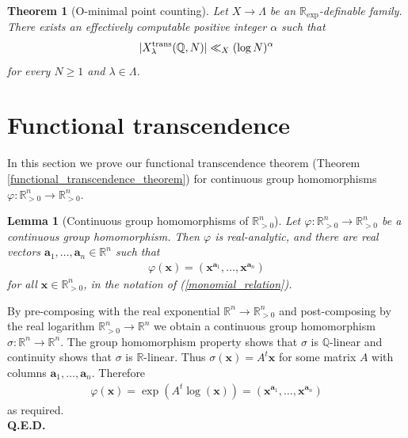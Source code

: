 \documentclass[9pt]{amsart}
\theoremstyle{my_theorem_style}
\numberwithin{definition}{section}
\newtheorem{theorem}[definition]{Theorem}
\newtheorem{lemma}[definition]{Lemma}
\renewenvironment{proof}{\noindent {\textbf{Proof.}}}{\\\textbf{Q.E.D.}}
\renewcommand{\phi}{\varphi}
\newcommand{\Q}{\mathbb{Q}}
\newcommand{\R}{\mathbb{R}}
\renewcommand{\vec}[1]{\bm{#1}}
\begin{document}
\begin{theorem}
[O-minimal point counting]
\label{bnz_counting_theorem}
    \cite[Equation (6)]{Binyamini--Novikov--Zak_Wilkie's_conjecture_for_Pfaffian_structures}
    Let $X \to \Lambda$ be an $\R_{\exp}$-definable family. There exists an effectively computable positive integer $\alpha$ such that
    \begin{align*}
        |X^{\rm trans}_\lambda(\Q, N)| \ll_X (\log N)^\alpha
    \end{align*}
    for every $N \geq 1$ and $\lambda \in \Lambda$.
\end{theorem}
\section{Functional transcendence}
\label{functional_transcendence_section}

In this section we prove our functional transcendence theorem (Theorem \ref{functional_transcendence_theorem}) for continuous group homomorphisms $\phi : \R_{>0}^n \to \R_{>0}^n$.

\begin{lemma}
    [Continuous group homomorphisms of $\R_{>0}^n$]
    \label{continuous_group_homomorphisms_of_the_orthant}
    Let $\phi : \R_{>0}^n \to \R_{>0}^n$ be a continuous group homomorphism. Then $\phi$ is real-analytic, and there are real vectors $\vec{a}_1, \dots, \vec{a}_n \in \R^n$ such that
    \begin{align*}
        \phi(\vec{x}) = 
        (\vec{x}^{\vec{a}_1}, \dots, \vec{x}^{\vec{a}_n})
    \end{align*}
    for all $\vec{x} \in \R_{>0}^n$, in the notation of (\ref{monomial_relation}).
\end{lemma}
\begin{proof}
    By pre-composing with the real exponential $\R^n \to \R_{>0}^n$ and post-composing by the real logarithm $\R_{>0}^n \to \R^n$ we obtain a continuous group homomorphism $\sigma : \R^n \to \R^n$. The group homomorphism property shows that $\sigma$ is $\Q$-linear and continuity shows that $\sigma$ is $\R$-linear. Thus $\sigma(\vec{x}) = A^t \vec{x}$ for some matrix $A$ with columns $\vec{a}_1, \dots, \vec{a}_n$. Therefore
    \begin{align*}
        \phi(\vec{x}) = \exp(A^t \log(\vec{x})) =
        (\vec{x}^{\vec{a}_1}, \dots, \vec{x}^{\vec{a}_n})
    \end{align*}
    as required.
\end{proof}
\end{document}
